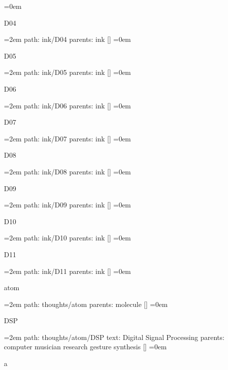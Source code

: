 \smallskip
\leftskip=0em
\par\endgroup
\bigskip
{}
D04
\smallskip
\par\begingroup
\leftskip=2em
path: ink/D04
\smallskip
parents:  ink []
\smallskip
\leftskip=0em
\par\endgroup
\bigskip
{}
D05
\smallskip
\par\begingroup
\leftskip=2em
path: ink/D05
\smallskip
parents:  ink []
\smallskip
\leftskip=0em
\par\endgroup
\bigskip
{}
D06
\smallskip
\par\begingroup
\leftskip=2em
path: ink/D06
\smallskip
parents:  ink []
\smallskip
\leftskip=0em
\par\endgroup
\bigskip
{}
D07
\smallskip
\par\begingroup
\leftskip=2em
path: ink/D07
\smallskip
parents:  ink []
\smallskip
\leftskip=0em
\par\endgroup
\bigskip
{}
D08
\smallskip
\par\begingroup
\leftskip=2em
path: ink/D08
\smallskip
parents:  ink []
\smallskip
\leftskip=0em
\par\endgroup
\bigskip
{}
D09
\smallskip
\par\begingroup
\leftskip=2em
path: ink/D09
\smallskip
parents:  ink []
\smallskip
\leftskip=0em
\par\endgroup
\bigskip
{}
D10
\smallskip
\par\begingroup
\leftskip=2em
path: ink/D10
\smallskip
parents:  ink []
\smallskip
\leftskip=0em
\par\endgroup
\bigskip
{}
D11
\smallskip
\par\begingroup
\leftskip=2em
path: ink/D11
\smallskip
parents:  ink []
\smallskip
\leftskip=0em
\par\endgroup
\bigskip
{}
atom
\smallskip
\par\begingroup
\leftskip=2em
path: thoughts/atom
\smallskip
parents:  molecule []
\smallskip
\leftskip=0em
\par\endgroup
\bigskip
{}
DSP
\smallskip
\par\begingroup
\leftskip=2em
path: thoughts/atom/DSP
\smallskip
text:  Digital Signal Processing
\smallskip
parents:  computer musician research gesture synthesis []
\smallskip
\leftskip=0em
\par\endgroup
\bigskip
{}
a
\smallskip
